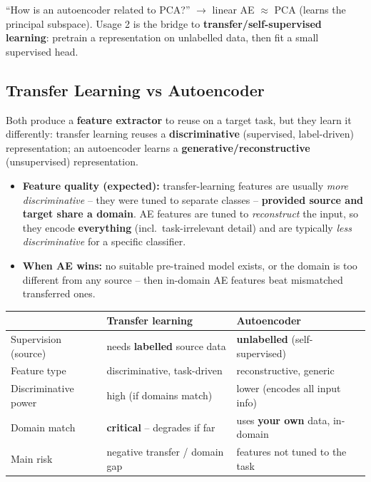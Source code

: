\documentclass[10pt,a4paper]{article}
\begin{document}
	\begin{examtipbox}
		``How is an autoencoder related to PCA?'' $\to$ linear AE $\approx$ PCA (learns the principal subspace). Usage 2 is the bridge to \textbf{transfer/self-supervised learning}: pretrain a representation on unlabelled data, then fit a small supervised head.
	\end{examtipbox}

	\subsection{Transfer Learning vs Autoencoder}

	\begin{definitionbox}
		Both produce a \textbf{feature extractor} to reuse on a target task, but they learn it differently: transfer learning reuses a \textbf{discriminative} (supervised, label-driven) representation; an autoencoder learns a \textbf{generative/reconstructive} (unsupervised) representation.
	\end{definitionbox}

	\begin{itemize}[leftmargin=*]
		\item \textbf{Feature quality (expected):} transfer-learning features are usually \emph{more discriminative} -- they were tuned to separate classes -- \textbf{provided source and target share a domain}. AE features are tuned to \emph{reconstruct} the input, so they encode \textbf{everything} (incl.\ task-irrelevant detail) and are typically \emph{less discriminative} for a specific classifier.
		\item \textbf{When AE wins:} no suitable pre-trained model exists, or the domain is too different from any source -- then in-domain AE features beat mismatched transferred ones.
	\end{itemize}

	\begin{center}
	\begin{tabular}{@{}lll@{}}
		\toprule
		 & \textbf{Transfer learning} & \textbf{Autoencoder} \\
		\midrule
		Supervision (source) & needs \textbf{labelled} source data & \textbf{unlabelled} (self-supervised) \\
		Feature type & discriminative, task-driven & reconstructive, generic \\
		Discriminative power & high (if domains match) & lower (encodes all input info) \\
		Domain match & \textbf{critical} -- degrades if far & uses \textbf{your own} data, in-domain \\
		Main risk & negative transfer / domain gap & features not tuned to the task \\
		\bottomrule
	\end{tabular}
	\end{center}
\end{document}
